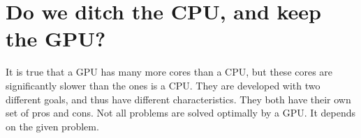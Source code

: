 \section{Do we ditch the CPU, and keep the GPU?}
\label{sec:cpu vs gpu}

It is true that a GPU has many more cores than a CPU, but these cores are significantly slower than the ones is a CPU.
They are developed with two different goals, and thus have different characteristics.
They both have their own set of pros and cons.
Not all problems are solved optimally by a GPU.
It depends on the given problem.

